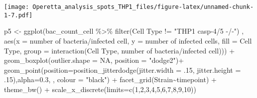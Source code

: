 \documentclass[
]{article}
\newenvironment{Shaded}{\begin{snugshade}}{\end{snugshade}}
\newcommand{\AttributeTok}[1]{\textcolor[rgb]{0.77,0.63,0.00}{#1}}
\newcommand{\ConstantTok}[1]{\textcolor[rgb]{0.00,0.00,0.00}{#1}}
\newcommand{\DecValTok}[1]{\textcolor[rgb]{0.00,0.00,0.81}{#1}}
\newcommand{\FloatTok}[1]{\textcolor[rgb]{0.00,0.00,0.81}{#1}}
\newcommand{\FunctionTok}[1]{\textcolor[rgb]{0.00,0.00,0.00}{#1}}
\newcommand{\NormalTok}[1]{#1}
\newcommand{\OtherTok}[1]{\textcolor[rgb]{0.56,0.35,0.01}{#1}}
\newcommand{\SpecialCharTok}[1]{\textcolor[rgb]{0.00,0.00,0.00}{#1}}
\newcommand{\StringTok}[1]{\textcolor[rgb]{0.31,0.60,0.02}{#1}}
\begin{document}
\texttt{[image: Operetta\_analysis\_spots\_THP1\_files/figure-latex/unnamed-chunk-1-7.pdf]}

\begin{Shaded}
\begin{Highlighting}[]
\NormalTok{p5 }\OtherTok{\textless{}{-}} \FunctionTok{ggplot}\NormalTok{(bac\_count\_cell }\SpecialCharTok{\%\textgreater{}\%}
               \FunctionTok{filter}\NormalTok{(}\StringTok{\textasciigrave{}}\AttributeTok{Cell Type}\StringTok{\textasciigrave{}} \SpecialCharTok{!=} \StringTok{"THP1 casp{-}4/5 {-}/{-}"}\NormalTok{)}
\NormalTok{             , }\FunctionTok{aes}\NormalTok{(}\AttributeTok{x =} \StringTok{\textasciigrave{}}\AttributeTok{number of bacteria/infected cell}\StringTok{\textasciigrave{}}\NormalTok{, }\AttributeTok{y =} \StringTok{\textasciigrave{}}\AttributeTok{number of infected cells}\StringTok{\textasciigrave{}}\NormalTok{, }\AttributeTok{fill =} \StringTok{\textasciigrave{}}\AttributeTok{Cell Type}\StringTok{\textasciigrave{}}\NormalTok{,}
                                 \AttributeTok{group =}  \FunctionTok{interaction}\NormalTok{(}\StringTok{\textasciigrave{}}\AttributeTok{Cell Type}\StringTok{\textasciigrave{}}\NormalTok{, }\StringTok{\textasciigrave{}}\AttributeTok{number of bacteria/infected cell}\StringTok{\textasciigrave{}}\NormalTok{))) }\SpecialCharTok{+}
  \FunctionTok{geom\_boxplot}\NormalTok{(}\AttributeTok{outlier.shape =} \ConstantTok{NA}\NormalTok{, }\AttributeTok{position =} \StringTok{"dodge2"}\NormalTok{)}\SpecialCharTok{+}
  \FunctionTok{geom\_point}\NormalTok{(}\AttributeTok{position=}\FunctionTok{position\_jitterdodge}\NormalTok{(}\AttributeTok{jitter.width =}\NormalTok{ .}\DecValTok{15}\NormalTok{, }\AttributeTok{jitter.height =}\NormalTok{ .}\DecValTok{15}\NormalTok{),}\AttributeTok{alpha=}\FloatTok{0.3}\NormalTok{, , }\AttributeTok{colour =} \StringTok{"black"}\NormalTok{) }\SpecialCharTok{+}
  \FunctionTok{facet\_grid}\NormalTok{(Strain}\SpecialCharTok{\textasciitilde{}}\NormalTok{timepoint) }\SpecialCharTok{+}
  \FunctionTok{theme\_bw}\NormalTok{() }\SpecialCharTok{+}
  \FunctionTok{scale\_x\_discrete}\NormalTok{(}\AttributeTok{limits=}\FunctionTok{c}\NormalTok{(}\DecValTok{1}\NormalTok{,}\DecValTok{2}\NormalTok{,}\DecValTok{3}\NormalTok{,}\DecValTok{4}\NormalTok{,}\DecValTok{5}\NormalTok{,}\DecValTok{6}\NormalTok{,}\DecValTok{7}\NormalTok{,}\DecValTok{8}\NormalTok{,}\DecValTok{9}\NormalTok{,}\DecValTok{10}\NormalTok{))}
\end{Highlighting}
\end{Shaded}
\end{document}

